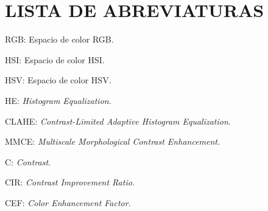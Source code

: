 \chapter*{LISTA DE ABREVIATURAS}
RGB: Espacio de color RGB.

HSI: Espacio de color HSI.

HSV: Espacio de color HSV.

HE: \textit{Histogram Equalization}.

CLAHE: \textit{Contrast-Limited Adaptive Histogram Equalization}.

MMCE: \textit{Multiscale Morphological Contrast Enhancement}.

C: \textit{Contrast}.

CIR: \textit{Contrast Improvement Ratio}.

CEF: \textit{Color Enhancement Factor}.